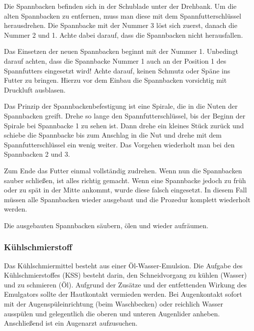 \documentclass{\basedir/fablab-document}
\begin{document}
Die Spannbacken befinden sich in der Schublade unter der Drehbank.
Um die alten Spannbacken zu entfernen, muss man diese mit dem Spannfutterschlüssel herausdrehen.
Die Spannbacke mit der Nummer 3 löst sich zuerst, danach die Nummer 2 und 1.
Achte dabei darauf, dass die Spannbacken nicht herausfallen.

Das Einsetzen der neuen Spannbacken beginnt mit der Nummer 1.
Unbedingt darauf achten, dass die Spannbacke Nummer 1 auch an der Position 1 des Spannfutters eingesetzt wird!
Achte darauf, keinen Schmutz oder Späne ins Futter zu bringen. Hierzu vor dem Einbau die Spannbacken vorsichtig mit Druckluft ausblasen.

Das Prinzip der Spannbackenbefestigung ist eine Spirale, die in die Nuten der Spannbacken greift.
Drehe so lange den Spannfutterschlüssel, bis der Beginn der Spirale bei Spannbacke 1 zu sehen ist.
Dann drehe ein kleines Stück zurück und schiebe die Spannbacke bis zum Anschlag in die Nut und drehe mit dem Spannfutterschlüssel ein wenig weiter.
Das Vorgehen wiederholt man bei den Spannbacken 2 und 3.

Zum Ende das Futter einmal vollständig zudrehen.
Wenn nun die Spannbacken sauber schließen, ist alles richtig gemacht.
Wenn eine Spannbacke jedoch zu früh oder zu spät in der Mitte ankommt, wurde diese falsch eingesetzt.
In diesem Fall müssen alle Spannbacken wieder ausgebaut und die Prozedur komplett wiederholt werden.

Die ausgebauten Spannbacken säubern, ölen und wieder aufräumen.

\subsubsection{Kühlschmierstoff}

Das Kühlschmiermittel besteht aus einer Öl-Wasser-Emulsion.
Die Aufgabe des Kühlschmierstoffes (KSS) besteht darin, den Schneidvorgang zu kühlen (Wasser) und zu schmieren (Öl).
Aufgrund der Zusätze und der entfettenden Wirkung des Emulgators sollte der Hautkontakt vermieden werden.
Bei Augenkontakt sofort mit der Augenspüleinrichtung (beim Waschbecken) oder reichlich Wasser ausspülen und gelegentlich die oberen und unteren Augenlider anheben.
Anschließend ist ein Augenarzt aufzusuchen.
\end{document}

